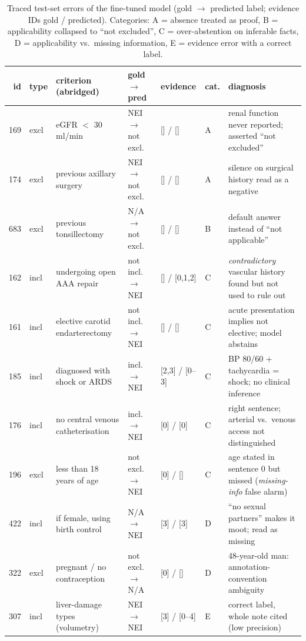 \begin{table}[t]\centering\small
\caption{Traced test-set errors of the fine-tuned model (gold $\rightarrow$ predicted label; evidence IDs gold / predicted). Categories: A = absence treated as proof, B = applicability collapsed to ``not excluded'', C = over-abstention on inferable facts, D = applicability vs.\ missing information, E = evidence error with a correct label.}\label{tab:errors}
\begin{tabular}{@{}rllllll@{}}
\toprule
id & type & criterion (abridged) & gold $\rightarrow$ pred & evidence & cat. & diagnosis \\
\midrule
169 & excl & eGFR $<$ 30 ml/min & NEI $\rightarrow$ not excl. & [] / [] & A & renal function never reported; asserted ``not excluded'' \\
174 & excl & previous axillary surgery & NEI $\rightarrow$ not excl. & [] / [] & A & silence on surgical history read as a negative \\
683 & excl & previous tonsillectomy & N/A $\rightarrow$ not excl. & [] / [] & B & default answer instead of ``not applicable'' \\
162 & incl & undergoing open AAA repair & not incl. $\rightarrow$ NEI & [] / [0,1,2] & C & \emph{contradictory} vascular history found but not used to rule out \\
161 & incl & elective carotid endarterectomy & not incl. $\rightarrow$ NEI & [] / [] & C & acute presentation implies not elective; model abstains \\
185 & incl & diagnosed with shock or ARDS & incl. $\rightarrow$ NEI & [2,3] / [0--3] & C & BP 80/60 + tachycardia = shock; no clinical inference \\
176 & incl & no central venous catheterisation & incl. $\rightarrow$ NEI & [0] / [0] & C & right sentence; arterial vs.\ venous access not distinguished \\
196 & excl & less than 18 years of age & not excl. $\rightarrow$ NEI & [0] / [] & C & age stated in sentence 0 but missed (\emph{missing-info} false alarm) \\
422 & incl & if female, using birth control & N/A $\rightarrow$ NEI & [3] / [3] & D & ``no sexual partners'' makes it moot; read as missing \\
322 & excl & pregnant / no contraception & not excl. $\rightarrow$ N/A & [0] / [] & D & 48-year-old man: annotation-convention ambiguity \\
307 & incl & liver-damage types (volumetry) & NEI $\rightarrow$ NEI & [3] / [0--4] & E & correct label, whole note cited (low precision) \\
\bottomrule
\end{tabular}
\end{table}
